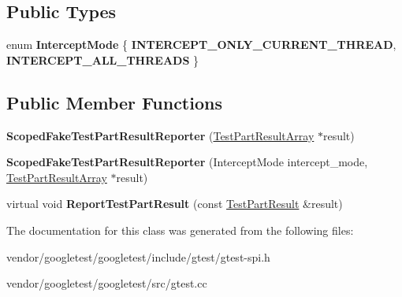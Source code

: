 \subsection*{Public Types}
\begin{DoxyCompactItemize}
\item 
\mbox{\label{classtesting_1_1_scoped_fake_test_part_result_reporter_a82f6209b3cf5c4b15ec8bd8041dbc2d5}} 
enum {\bfseries Intercept\+Mode} \{ {\bfseries I\+N\+T\+E\+R\+C\+E\+P\+T\+\_\+\+O\+N\+L\+Y\+\_\+\+C\+U\+R\+R\+E\+N\+T\+\_\+\+T\+H\+R\+E\+AD}, 
{\bfseries I\+N\+T\+E\+R\+C\+E\+P\+T\+\_\+\+A\+L\+L\+\_\+\+T\+H\+R\+E\+A\+DS}
 \}
\end{DoxyCompactItemize}
\subsection*{Public Member Functions}
\begin{DoxyCompactItemize}
\item 
\mbox{\label{classtesting_1_1_scoped_fake_test_part_result_reporter_aa0100ecf4799fb51d45167be6a5de1d5}} 
{\bfseries Scoped\+Fake\+Test\+Part\+Result\+Reporter} (\hyperlink{classtesting_1_1_test_part_result_array}{Test\+Part\+Result\+Array} $\ast$result)
\item 
\mbox{\label{classtesting_1_1_scoped_fake_test_part_result_reporter_a57cbc09ed48627c8a73e622618dc4b4f}} 
{\bfseries Scoped\+Fake\+Test\+Part\+Result\+Reporter} (Intercept\+Mode intercept\+\_\+mode, \hyperlink{classtesting_1_1_test_part_result_array}{Test\+Part\+Result\+Array} $\ast$result)
\item 
\mbox{\label{classtesting_1_1_scoped_fake_test_part_result_reporter_a82531434f51632d98ed7cdcdb10b8b92}} 
virtual void {\bfseries Report\+Test\+Part\+Result} (const \hyperlink{classtesting_1_1_test_part_result}{Test\+Part\+Result} \&result)
\end{DoxyCompactItemize}


The documentation for this class was generated from the following files\+:\begin{DoxyCompactItemize}
\item 
vendor/googletest/googletest/include/gtest/gtest-\/spi.\+h\item 
vendor/googletest/googletest/src/gtest.\+cc\end{DoxyCompactItemize}
